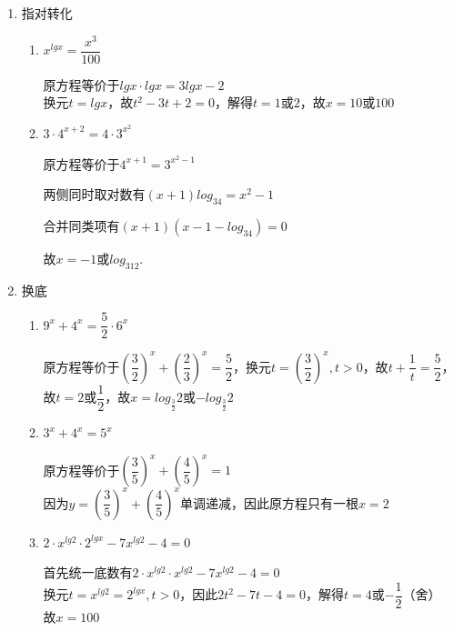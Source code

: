 \begin{enumerate}
\begin{enumerate}
        \item $log_3(3^x-1) \cdot log_3(3^{x-1}-\dfrac{1}{3})=2$
        \begin{jieda}
            原方程等价于$log_3(3^x-1) \cdot log_3(\dfrac{1}{3}(3^{x}-1))=2$，即$log_3(3^x-1) \cdot (log_3(3^{x}-1)-1)=2$ \\
            换元$t = log_3(3^x-1), t \in \mathbf{R}$，故$t(t-1) = 2$，解得$t = 2$或$-1$ \\
            因此$3^x - 1 = 9$或$\dfrac{1}{3}$，故$x = log_310$或$log_3\dfrac{4}{3}$ 
        \end{jieda}
    \end{enumerate}
    \item 指对转化
    \begin{enumerate}
        \item $x^{lgx} = \dfrac{x^3}{100}$
        \begin{jieda}
            原方程等价于$lgx \cdot lgx = 3lgx - 2$ \\
            换元$t = lgx$，故$t^2 -3t+2 = 0$，解得$t = 1$或$2$，故$x = 10$或$100$
        \end{jieda}
        \item $3 \cdot  {4}^{x+ 2}  = 4 \cdot  {3}^{{x}^{2}}$
        \begin{jieda}
            原方程等价于${4}^{x+1}  = {3}^{{x}^{2}-1}$

            两侧同时取对数有$(x+1)log_34 = x^2 - 1$

            合并同类项有$(x+1)(x-1-log_34) = 0$

            故$x = -1$或$log_312$.
        \end{jieda}
    \end{enumerate}
    \item 换底
    \begin{enumerate}
        \item $9^x + 4^x = \dfrac{5}{2} \cdot 6^x$
        \begin{jieda}
            原方程等价于$(\dfrac{3}{2})^x + (\dfrac{2}{3})^x = \dfrac{5}{2}$，换元$t = (\dfrac{3}{2})^x, t > 0$，故$t + \dfrac{1}{t} = \dfrac{5}{2}$，故$t = 2$或$\dfrac{1}{2}$，故$x = log_{\frac{3}{2}}2$或$-log_{\frac{3}{2}}2$
        \end{jieda}
        \item $3^x + 4^x = 5^x$
        \begin{jieda}
            原方程等价于$(\dfrac{3}{5})^x + (\dfrac{4}{5})^x = 1$ \\
            因为$y = (\dfrac{3}{5})^x + (\dfrac{4}{5})^x $单调递减，因此原方程只有一根$x = 2$
        \end{jieda}
        \item $2 \cdot x^{lg2} \cdot 2^{lgx} - 7x^{lg2} - 4 = 0$
        \begin{jieda}
            首先统一底数有$2 \cdot x^{lg2} \cdot x^{lg2} - 7x^{lg2} - 4 = 0$ \\
            换元$t = x^{lg2} = 2^{lgx}, t > 0$，因此$2t^2-7t-4 = 0$，解得$t = 4$或$-\dfrac{1}{2}$（舍）\\
            故$x = 100$
        \end{jieda}
    \end{enumerate}
\end{enumerate}
